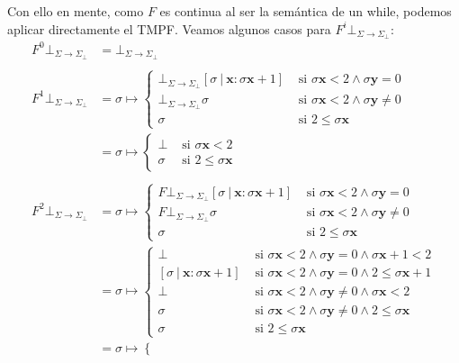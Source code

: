 \documentclass{article}
\newcommand{\x}{\textbf{x}}
\newcommand{\y}{\textbf{y}}
\newcommand{\cdom}{\Sigma \to \Sigma_\bot}
\newcommand{\cfbot}{\bot_{\cdom}}
\begin{document}
Con ello en mente, como $F$ es continua al ser la semántica de un while, podemos aplicar directamente el TMPF.
Veamos algunos casos para $F^i \cfbot$:
\begin{equation*}
  \begin{aligned}
    F^0 \cfbot &= \cfbot \\ 
    \\ 
    F^1 \cfbot &= \sigma \mapsto \begin{cases}
      \cfbot [\sigma\ |\ \x : \sigma\x + 1] &\text{ si } \sigma\x < 2 \land \sigma\y = 0 \\ 
      \cfbot \sigma &\text{ si }\sigma\x < 2 \land \sigma\y \neq 0 \\ 
      \sigma &\text{ si }2 \leq \sigma\x
    \end{cases} \\ 
               &= \sigma \mapsto \begin{cases}
                 \bot &\text{ si } \sigma\x < 2 \\ 
                 \sigma &\text{ si } 2 \leq \sigma\x
               \end{cases} \\ 
               \\ 
      F^2 \cfbot &= \sigma \mapsto \begin{cases}
        F \cfbot [\sigma\ |\ \x : \sigma\x+1] &\text{ si }\sigma\x < 2 \land \sigma\y = 0 \\ 
        F \cfbot \sigma &\text{ si }\sigma\x < 2 \land \sigma\y \neq 0 \\ 
        \sigma &\text{ si }2 \leq \sigma\x
      \end{cases} \\ 
                 &= \sigma \mapsto \begin{cases}
                   \bot &\text{ si }\sigma\x < 2 \land \sigma\y = 0 \land \sigma\x+1 < 2 \\ 
                   [\sigma\ |\ \x : \sigma\x+1] &\text{ si }\sigma\x < 2 \land \sigma\y = 0 \land 2 \leq \sigma\x+1 \\ 
                   \bot &\text{ si }\sigma\x < 2 \land \sigma\y \neq 0 \land \sigma\x < 2 \\ 
                   \sigma &\text{ si }\sigma\x < 2 \land \sigma\y \neq 0 \land 2 \leq \sigma\x \\ 
                   \sigma &\text{ si } 2 \leq \sigma\x
                 \end{cases} \\ 
                 &= \sigma \mapsto \begin{cases}

\end{cases}
\end{aligned}
\end{equation*}
\end{document}
